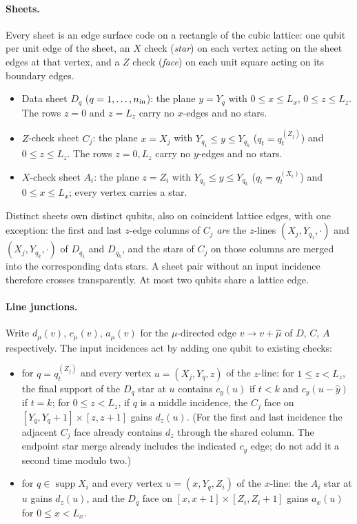 \paragraph{Sheets.}
Every sheet is an edge surface code on a rectangle of the cubic lattice: one
qubit per unit edge of the sheet, an $X$ check (\emph{star}) on each vertex
acting on the sheet edges at that vertex, and a $Z$ check (\emph{face}) on
each unit square acting on its boundary edges.
\begin{itemize}
\item Data sheet $D_q$ ($q=1,\dots,n_{\rm in}$): the plane $y=Y_q$ with
$0\le x\le L_x$, $0\le z\le L_z$.  The rows $z=0$ and $z=L_z$ carry no
$x$-edges and no stars.
\item $Z$-check sheet $C_j$: the plane $x=X_j$ with
$Y_{q_1}\le y\le Y_{q_k}$ ($q_t=q_t^{(Z_j)}$) and $0\le z\le L_z$.  The rows
$z=0,L_z$ carry no $y$-edges and no stars.
\item $X$-check sheet $A_i$: the plane $z=Z_i$ with
$Y_{q_1}\le y\le Y_{q_k}$ ($q_t=q_t^{(X_i)}$) and $0\le x\le L_x$; every
vertex carries a star.
\end{itemize}
Distinct sheets own distinct qubits, also on coincident lattice edges, with
one exception: the first and last $z$-edge columns of $C_j$ \emph{are} the
$z$-lines $(X_j,Y_{q_1},\cdot)$ and $(X_j,Y_{q_k},\cdot)$ of $D_{q_1}$ and
$D_{q_k}$, and the stars of $C_j$ on those columns are merged into the
corresponding data stars.  A sheet pair without an input incidence therefore
crosses transparently.  At most two qubits share a lattice edge.

\paragraph{Line junctions.}
Write $d_\mu(v)$, $c_\mu(v)$, $a_\mu(v)$ for the $\mu$-directed edge
$v\to v+\hat\mu$ of $D$, $C$, $A$ respectively.  The input incidences act by
adding one qubit to existing checks:
\begin{itemize}
\item[(Z)] for $q=q_t^{(Z_j)}$ and every vertex $u=(X_j,Y_q,z)$ of the
$z$-line: for $1\le z<L_z$, the final support of the $D_q$ star at $u$ contains $c_y(u)$ if $t<k$ and $c_y(u-\hat y)$ if
$t=k$; for $0\le z<L_z$, if $q$ is a middle incidence, the $C_j$ face on
$[Y_q,Y_q+1]\times[z,z+1]$ gains $d_z(u)$.  (For the first and last incidence
the adjacent $C_j$ face already contains $d_z$ through the shared column.
The endpoint star merge already includes the indicated $c_y$ edge; do not
add it a second time modulo two.)
\item[(X)] for $q\in\operatorname{supp}X_i$ and every vertex
$u=(x,Y_q,Z_i)$ of the $x$-line: the $A_i$ star at $u$ gains $d_z(u)$, and the
$D_q$ face on $[x,x+1]\times[Z_i,Z_i+1]$ gains $a_x(u)$ for
$0\le x<L_x$.
\end{itemize}

